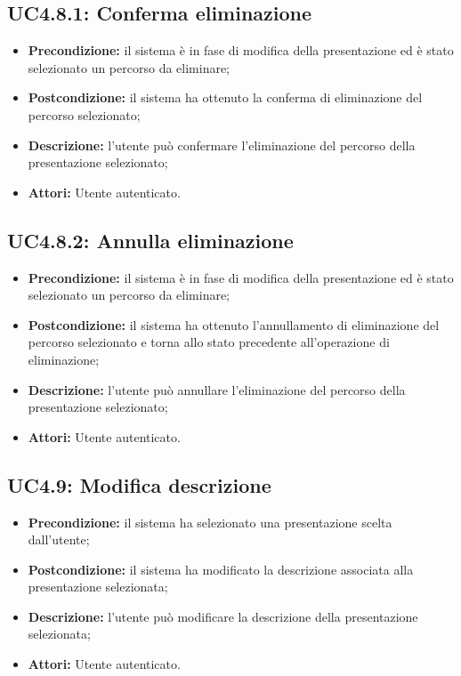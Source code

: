 \subsection{ UC4.8.1: Conferma eliminazione}

\begin{itemize}
	\item \textbf{Precondizione:} il sistema è in fase di modifica della presentazione ed è stato selezionato un percorso da eliminare;
	\item \textbf{Postcondizione:} il sistema ha ottenuto la conferma di eliminazione del percorso selezionato;
	\item \textbf{Descrizione:} l'utente può confermare l'eliminazione del percorso della presentazione selezionato;
	\item \textbf{Attori:} Utente autenticato.
\end{itemize}
\subsection{ UC4.8.2: Annulla eliminazione}

\begin{itemize}
	\item \textbf{Precondizione:} il sistema è in fase di modifica della presentazione ed è stato selezionato un percorso da eliminare;
	\item \textbf{Postcondizione:} il sistema ha ottenuto l'annullamento di eliminazione del percorso selezionato e torna allo stato precedente all'operazione di eliminazione;
	\item \textbf{Descrizione:} l'utente può annullare l'eliminazione del percorso della presentazione selezionato;
	\item \textbf{Attori:} Utente autenticato.
\end{itemize}
\subsection{ UC4.9: Modifica descrizione}

\begin{itemize}
	\item \textbf{Precondizione:} il sistema ha selezionato una presentazione scelta dall'utente;
	\item \textbf{Postcondizione:} il sistema ha modificato la descrizione associata alla presentazione selezionata;
	\item \textbf{Descrizione:} l'utente può modificare la descrizione della presentazione selezionata;
	\item \textbf{Attori:} Utente autenticato.
\end{itemize}
